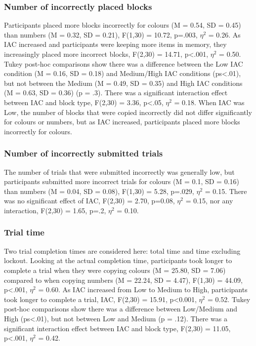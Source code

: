 \subsubsection{Number of incorrectly placed blocks}
Participants placed more blocks incorrectly for colours (M = 0.54, SD = 0.45) than numbers (M = 0.32, SD = 0.21), F(1,30) = 10.72, p=.003, $\eta^2$ = 0.26. As IAC increased and participants were keeping more items in memory, they increasingly placed more incorrect blocks, F(2,30) = 14.71, p<.001, $\eta^2$ = 0.50. Tukey post-hoc comparisons show there was a difference between the Low IAC condition (M = 0.16, SD = 0.18) and Medium/High IAC conditions (ps<.01), but not between the Medium (M = 0.49, SD = 0.35) and High IAC conditions (M = 0.63, SD = 0.36) (p = .3). There was a significant interaction effect between IAC and block type, F(2,30) = 3.36, p<.05, $\eta^2$ = 0.18. When IAC was Low, the number of blocks that were copied incorrectly did not differ significantly for colours or numbers, but as IAC increased, participants placed more blocks incorrectly for colours.

\subsubsection{Number of incorrectly submitted trials}
The number of trials that were submitted incorrectly was generally low, but participants submitted more incorrect trials for colours (M = 0.1, SD = 0.16) than numbers (M = 0.04, SD = 0.08), F(1,30) = 5.28, p=.029, $\eta^2$ = 0.15. There was no significant effect of IAC, F(2,30) = 2.70, p=0.08, $\eta^2$ = 0.15, nor any interaction, F(2,30) = 1.65, p=.2, $\eta^2$ = 0.10.

\subsubsection{Trial time}
Two trial completion times are considered here: total time and time excluding lockout. 
Looking at the actual completion time, participants took longer to complete a trial when they were copying colours (M = 25.80, SD = 7.06) compared to when copying numbers (M = 22.24, SD = 4.47), F(1,30) = 44.09, p<.001, $\eta^2$ = 0.60. As IAC increased from Low to Medium to High, participants took longer to complete a trial, IAC, F(2,30) = 15.91, p<0.001, $\eta^2$ = 0.52. Tukey post-hoc comparisons show there was a difference between Low/Medium and High (ps<.01), but not between Low and Medium (p = .12). There was a significant interaction effect between IAC and block type, F(2,30) = 11.05, p<.001, $\eta^2$ = 0.42. 

